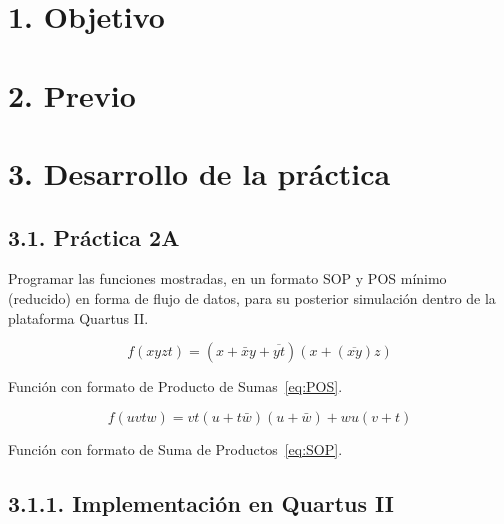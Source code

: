 \documentclass[letterpaper]{article} %
\begin{document}
    \section{1. Objetivo}


    \section*{2. Previo}

    \section*{3. Desarrollo de la pr\'actica}
        \subsection*{3.1. Pr\'actica 2A}
        Programar las funciones mostradas, en un formato SOP y POS m\'inimo (reducido) en
        forma de flujo de datos, para su posterior simulaci\'on dentro de la plataforma Quartus II.

        \begin{equation}
            \label{eq:POS}
            f(xyzt) = (x + \bar{x}y + \overline{yt})(x + (\overline{xy})z)
        \end{equation}

        Funci\'on con formato de Producto de Sumas~\ref{eq:POS}.

        \begin{equation}
            \label{eq:SOP}
            f(uvtw) = vt(u + t\bar{w})(u + \bar{w}) + wu(v +t)
        \end{equation}

        Funci\'on con formato de Suma de Productos~\ref{eq:SOP}.

            \subsection*{3.1.1. Implementaci\'on en Quartus II}

                \begin{figure}[H]
                    \raggedright
                \end{figure}
\end{document}
